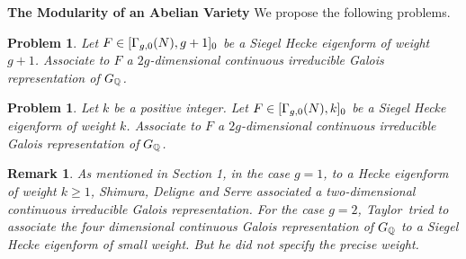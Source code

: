 \documentclass[11pt]{amsart}
\newtheorem{remark}[theorem]{Remark}
\newtheorem{problem}[theorem]{Problem}
\begin{document}
\begin{section}{{\bf The Modularity of an Abelian Variety}}
\vskip 3mm
We propose the following problems.
\vskip 2mm \noindent
\begin{problem}\label{prob:2.9}
Let $F\in [\Gamma_{g,0}(N),g+1]_0$ be a Siegel Hecke eigenform of weight $g+1$.
Associate to $F$ a $2g$-dimensional continuous irreducible Galois representation
of $G_\mathbb Q$.
\end{problem}

\vskip 2mm \noindent
\begin{problem}\label{prob:2.10}
Let $k$ be a positive integer.
Let $F\in [\Gamma_{g,0}(N),k]_0$ be a Siegel Hecke eigenform of weight $k$.
Associate to $F$ a $2g$-dimensional continuous irreducible Galois representation
of $G_\mathbb Q$.
\end{problem}

\begin{remark}\label{rk:2.11}
As mentioned in Section 1, in the case $g=1$, to a Hecke eigenform of weight $k\geq 1$, Shimura, Deligne and Serre associated a two-dimensional continuous irreducible Galois representation. For the case
$g=2$, Taylor\,\cite{T1,T2} tried to associate the four dimensional continuous Galois representation
of $G_\mathbb Q$ to a Siegel Hecke eigenform of small weight. But he did not specify the precise weight.
\end{remark}

\end{section}
\end{document}
